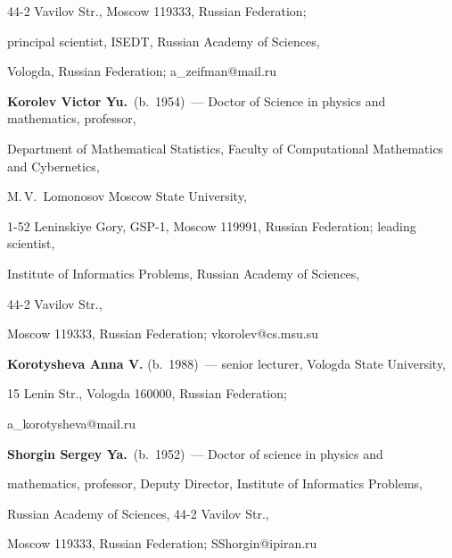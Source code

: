 44-2 Vavilov Str., Moscow 119333, Russian Federation;

principal scientist, ISEDT, Russian Academy of Sciences,

Vologda, Russian Federation; a\_zeifman@mail.ru



\vspace*{2pt}



\textbf{Korolev Victor Yu.}\ (b.\ 1954)~--- Doctor of Science in physics and mathematics, professor,

Department of Mathematical Statistics, Faculty of Computational Mathematics and Cybernetics,

M.\,V.~Lomonosov Moscow State University,

1-52 Leninskiye Gory, GSP-1, Moscow 119991, Russian Federation; leading scientist,

Institute of Informatics Problems, Russian Academy of Sciences,

44-2 Vavilov Str.,

Moscow 119333, Russian Federation; vkorolev@cs.msu.su



\vspace*{2pt}



\textbf{Korotysheva Anna V.} (b.\ 1988)~--- senior lecturer, Vologda State  University,

15 Lenin Str., Vologda 160000, Russian Federation;

a\_korotysheva@mail.ru



\vspace*{2pt}





\textbf{Shorgin Sergey Ya.}\ (b.\ 1952)~--- Doctor of science in physics and

mathematics, professor, Deputy Director, Institute of Informatics Problems,

Russian Academy of Sciences, 44-2 Vavilov Str.,

Moscow 119333, Russian Federation; SShorgin@ipiran.ru





 \label{end\stat}



\renewcommand{\bibname}{\protect\rm Литература}

